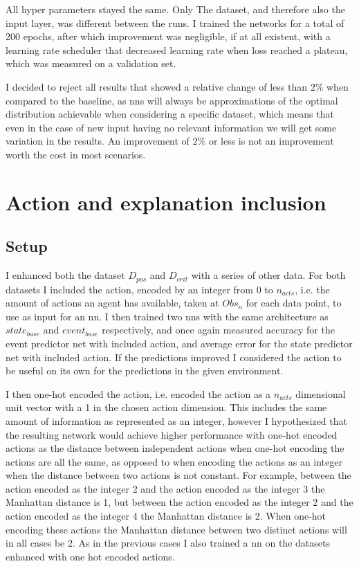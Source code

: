 \documentclass[UKenglish]{uiomasterthesis}
\begin{document}
All hyper parameters stayed the same. Only The dataset, and therefore also the input layer, was different between the runs. I trained the networks for a total of $200$ epochs, after which improvement was negligible, if at all existent, with a learning rate scheduler that decreased learning rate when loss reached a plateau, which was measured on a validation set.

I decided to reject all results that showed a relative change of less than $2\%$ when compared to the baseline, as \acp{nn} will always be approximations of the optimal distribution achievable when considering a specific dataset, which means that even in the case of new input having no relevant information we will get some variation in the results. An improvement of $2\%$ or less is not an improvement worth the cost in most scenarios.

\section{Action and explanation inclusion}
\subsection{Setup}
I enhanced both the dataset $D_{pos}$ and $D_{crit}$ with a series of other data. For both datasets I included the action, encoded by an integer from $0$ to $n_{acts}$, i.e. the amount of actions an agent has available, taken at $Obs_n$ for each data point, to use as input for an \ac{nn}. I then trained two \acp{nn} with the same architecture as $state_{base}$ and $event_{base}$ respectively, and once again measured accuracy for the event predictor net with included action, and average error for the state predictor net with included action. If the predictions improved I considered the action to be useful on its own for the predictions in the given environment.

I then one-hot encoded the action, i.e. encoded the action as a $n_{acts}$ dimensional unit vector with a 1 in the chosen action dimension. This includes the same amount of information as represented as an integer, however I hypothesized that the resulting network would achieve higher performance with one-hot encoded actions as the distance between independent actions when one-hot encoding the actions are all the same, as opposed to when encoding the actions as an integer when the distance between two actions is not constant. For example, between the action encoded as the integer 2 and the action encoded as the integer 3 the Manhattan distance is 1, but between the action encoded as the integer 2 and the action encoded as the integer 4 the Manhattan distance is 2. When one-hot encoding these actions the Manhattan distance between two distinct actions will in all cases be 2. As in the previous cases I also trained a \ac{nn} on the datasets enhanced with one hot encoded actions.
\end{document}
